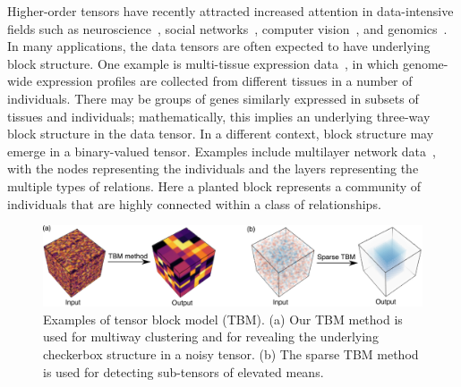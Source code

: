 \documentclass[11pt]{article}
\theoremstyle{plain}
\theoremstyle{definition}
\providecommand{\DIFaddbegin}{} %
\providecommand{\DIFaddend}{} %
\providecommand{\DIFdelend}{} %
\providecommand{\DIFaddbeginFL}{} %
\providecommand{\DIFaddendFL}{} %
\providecommand{\DIFdelbeginFL}{} %
\providecommand{\DIFdelendFL}{} %
\begin{document}
\DIFdelend \DIFaddbegin \vspace{-.2cm}
\DIFaddend Higher-order tensors have recently attracted increased attention in data-intensive fields such as neuroscience~\cite{cong2015tensor,zhou2013tensor}, social networks~\cite{nickel2011three,socher2013reasoning}, computer vision~\cite{tang2013tensor,liu2013tensor}, and genomics~\cite{wang2017three,hore2016tensor}. In many applications, the data tensors are often expected to have underlying block structure. One example is multi-tissue expression data~\cite{wang2017three}, in which genome-wide expression profiles are collected from different tissues in a number of individuals. There may be groups of genes similarly expressed in subsets of tissues and individuals; mathematically, this implies an underlying three-way block structure in the data tensor. In a different context, block structure may emerge in a binary-valued tensor. Examples include multilayer network data~\cite{nickel2011three}, with the nodes representing the individuals and the layers representing the multiple types of relations. Here a planted block represents a community of individuals that are highly connected within a class of relationships. 

\begin{figure}[h!]
\DIFaddbeginFL \vspace{-.2cm}
\DIFaddendFL \centering
\DIFdelbeginFL %
\DIFdelendFL \DIFaddbeginFL \includegraphics[width=.8\textwidth]{figures/demo.pdf}
\DIFaddendFL \caption{\small Examples of tensor block model (TBM). (a) Our TBM method is used for multiway clustering and for revealing the underlying checkerbox structure in a noisy tensor. (b) The sparse TBM method is used for detecting sub-tensors of elevated means. }
\label{fig:1}
\DIFaddbeginFL \vspace{-.2cm}
\DIFaddendFL \end{figure}
\end{document}
